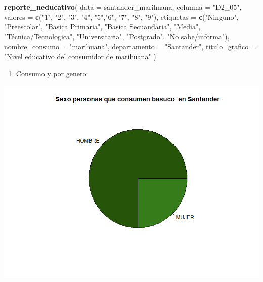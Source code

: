 \documentclass[
]{article}
\newenvironment{Shaded}{\begin{snugshade}}{\end{snugshade}}
\newcommand{\AttributeTok}[1]{\textcolor[rgb]{0.13,0.29,0.53}{#1}}
\newcommand{\FunctionTok}[1]{\textcolor[rgb]{0.13,0.29,0.53}{\textbf{#1}}}
\newcommand{\NormalTok}[1]{#1}
\newcommand{\StringTok}[1]{\textcolor[rgb]{0.31,0.60,0.02}{#1}}
\providecommand{\tightlist}{%
  \setlength{\itemsep}{0pt}\setlength{\parskip}{0pt}}
\begin{document}
\begin{Shaded}
\begin{Highlighting}[]
\FunctionTok{reporte\_neducativo}\NormalTok{(}
  \AttributeTok{data =}\NormalTok{ santander\_marihuana,}
  \AttributeTok{columna =} \StringTok{"D2\_05"}\NormalTok{,}
  \AttributeTok{valores =} \FunctionTok{c}\NormalTok{(}\StringTok{"1"}\NormalTok{, }\StringTok{"2"}\NormalTok{, }\StringTok{"3"}\NormalTok{, }\StringTok{"4"}\NormalTok{, }\StringTok{"5"}\NormalTok{,}\StringTok{"6"}\NormalTok{, }\StringTok{"7"}\NormalTok{, }\StringTok{"8"}\NormalTok{, }\StringTok{"9"}\NormalTok{),}
  \AttributeTok{etiquetas =} \FunctionTok{c}\NormalTok{(}\StringTok{"Ninguno"}\NormalTok{, }\StringTok{"Preescolar"}\NormalTok{, }\StringTok{"Basica Primaria"}\NormalTok{, }\StringTok{"Basica Secuandaria"}\NormalTok{, }\StringTok{"Media"}\NormalTok{, }\StringTok{"Técnica/Tecnologica"}\NormalTok{, }\StringTok{"Universitaria"}\NormalTok{, }\StringTok{"Postgrado"}\NormalTok{, }\StringTok{"No sabe/informa"}\NormalTok{),}
  \AttributeTok{nombre\_consumo =} \StringTok{"marihuana"}\NormalTok{,}
  \AttributeTok{departamento =} \StringTok{"Santander"}\NormalTok{,}
  \AttributeTok{titulo\_grafico =} \StringTok{"Nivel educativo del consumidor de marihuana"}
\NormalTok{)}
\end{Highlighting}
\end{Shaded}

\begin{enumerate}
\def\labelenumi{\arabic{enumi}.}
\setcounter{enumi}{3}
\tightlist
\item
  Consumo y por genero:
\end{enumerate}

\includegraphics{images/basuco S santander.png}
\end{document}
